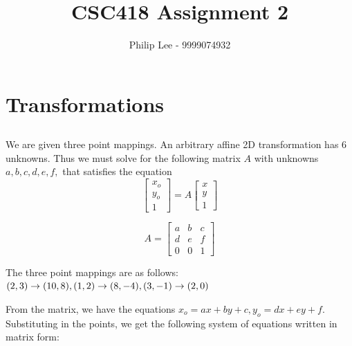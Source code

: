 \documentclass[a4paper,10pt]{scrartcl}
\title{CSC418 Assignment 2}
\author{Philip Lee - 9999074932}
\begin{document}
\maketitle

\section{Transformations}

\subsection{}

We are given three point mappings. An arbitrary affine 2D transformation has 6 unknowns. Thus we must solve for the following matrix $A$ with unknowns $a,b,c,d,e,f,$ that satisfies
the equation
\[ \begin{bmatrix}
      x_o \\ 
      y_o \\
      1
   \end{bmatrix} = A 
   \begin{bmatrix}
      x \\ 
      y \\
      1
   \end{bmatrix}
\]

\[A = \begin{bmatrix}
		  a & b & c \\
		  d & e & f \\
		  0 & 0 & 1
    \end{bmatrix}\]
    
The three point mappings are as follows: $(2,3) \rightarrow (10,8), (1,2) \rightarrow (8,-4), \\(3,-1) \rightarrow (2,0)$ 

From the matrix, we have the equations $x_o = ax + by + c, y_o = dx + ey + f$. Substituting in the points, we get the following system of equations written in matrix form:

\end{document}
